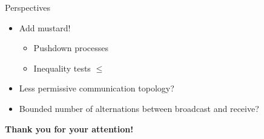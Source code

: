 \documentclass{beamer}
\begin{document}
\begin{frame}{Perspectives}
\begin{itemize}
	\item Add mustard! \begin{itemize}
		\item Pushdown processes
		\item Inequality tests $\leq$
	\end{itemize} 
		
	\item Less permissive communication topology?
	
	\item Bounded number of alternations between broadcast and receive?
\end{itemize} 

	\pause
	\vspace{1cm}\centering \large \textbf{Thank you for your attention!}
	
\end{frame}

%	
%	


%	
%	
%	
\end{document}
